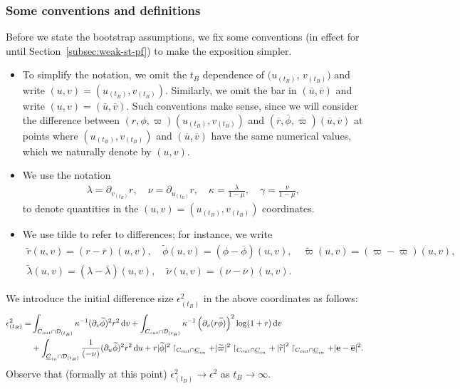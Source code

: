 \documentclass[10pt, reqno]{amsart}
\theoremstyle{definition}
\theoremstyle{remark}
\theoremstyle{conjecture}
\numberwithin{equation}{section}
\newcommand{\abs}[1]{\vert#1\vert}
\newcommand{\ud}{\mathrm{d}}
\newcommand{\rd}{\partial}
\newcommand{\0}{\emptyset}
\newcommand{\gmm}{\gamma}
\newcommand{\eps}{\epsilon}
\newcommand{\kpp}{\kappa}
\newcommand{\lmb}{\lambda}
\newcommand{\bfe}{{\bf e}}
\newcommand{\calD}{\mathcal D}
\newcommand{\calH}{\mathcal H}
\newcommand{\calI}{\mathcal I}
\newcommand{\uC}{\underline{C}}
\newcommand{\dur}{\nu}
\newcommand{\dvr}{\lmb}
\newcommand{\EH}{\calH^{+}}
\newcommand{\e}{\bfe}							%
\newcommand{\NI}{\calI^{+}}						%
\newcommand{\ubg}{\overline{u}}					%
\newcommand{\vbg}{\overline{v}}					%
\newcommand{\phibg}{\overline{\phi}}				%
\newcommand{\dvrbg}{\overline{\dvr}}				%
\newcommand{\durbg}{\overline{\dur}}				%
\newcommand{\rbg}{\overline{r}}					%
\newcommand{\varpibg}{\overline{\varpi}}				%
\newcommand{\ebg}{\overline{\e}}					%
\newcommand{\phidf}{\widetilde{\phi}}				%
\newcommand{\dvrdf}{\widetilde{\dvr}}				%
\newcommand{\durdf}{\widetilde{\dur}}				%
\newcommand{\rdf}{\widetilde{r}}					%
\newcommand{\varpidf}{\widetilde{\varpi}}				%
\newcommand{\Abs}[1]{\left\vert #1 \right\vert}
\begin{document}
\subsubsection*{Some conventions and definitions}
Before we state the bootstrap assumptions, we fix some conventions (in effect for until Section~\ref{subsec:weak-st-pf}) to make the exposition simpler.
\begin{itemize}
\item To simplify the notation, we omit the $t_{B}$ dependence of $(u_{(t_{B})}$, $v_{(t_{B})})$ and write $(u, v) = (u_{(t_{B})}, v_{(t_{B})})$. Similarly, we omit the bar in $(\ubg, \vbg)$ and write $(u, v) = (\ubg, \vbg)$. Such conventions make sense, since we will consider the difference between $(r, \phi, \varpi)(u_{(t_{B})}, v_{(t_{B})})$ and $(\rbg, \phibg, \varpibg)(\ubg, \vbg)$ at points where $(u_{(t_{B})}, v_{(t_{B})})$ and $(\ubg, \vbg)$ have the same numerical values, which we naturally denote by $(u, v)$. 
\item We use the notation
\begin{gather*}
	\dvr = \rd_{v_{(t_{B})}} r, \quad \dur = \rd_{u_{(t_{B})}} r, \quad
	\kpp = \frac{\dvr}{1-\mu}, \quad \gmm = \frac{\dur}{1-\mu},
\end{gather*}
to denote quantities in the $(u, v) = (u_{(t_{B})}, v_{(t_{B})})$ coordinates. 
\item We use tilde to refer to differences; for instance, we write
\begin{gather*}
	\rdf (u, v)= (r - \rbg)(u, v), \quad
	\phidf (u, v)= (\phi - \phibg)(u, v), \quad
	\varpidf (u, v) = (\varpi - \varpibg)(u, v), \\
	\dvrdf (u, v)= (\dvr - \dvrbg)(u, v), \quad 
	\durdf (u, v) = (\dur - \durbg)(u, v).
\end{gather*}
\end{itemize}

We introduce the initial difference size $\eps_{(t_{B})}^{2}$ in the above coordinates as follows:
\begin{equation} \label{eq:eps-tB}
\begin{aligned}
	\eps_{(t_{B})}^{2} 
= 	& \int_{C_{out} \cap \calD_{(t_{B})}} \kpp^{-1} (\rd_{v} \phidf)^{2} r^{2} \, \ud v 
	+ \int_{C_{out} \cap \calD_{(t_{B})}} \kpp^{-1} \left( \rd_{v} (r \phidf) \right)^{2} \log(1+r) \, \ud v  \\
	& + \int_{\uC_{in} \cap \calD_{(t_{B})}} \frac{1}{(-\dur)} (\rd_{u} \phidf)^{2} r^{2} \, \ud u  
	+ r \abs{\phidf}^{2} \restriction_{C_{out} \cap \uC_{in}}
	+ \abs{\varpidf}^{2} \restriction_{C_{out} \cap \uC_{in}}
	+ \Abs{\rdf}^{2} \restriction_{C_{out} \cap \uC_{in}} 
	+ \abs{\e - \ebg}^{2} .
\end{aligned}
\end{equation}
Observe that (formally at this point) $\eps_{(t_{B})}^{2} \to \eps^{2}$ as $t_{B} \to \infty$.
\end{document}
